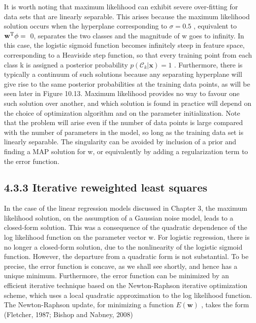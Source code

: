 \documentclass[
  10
]{article}
\begin{document}
It is worth noting that maximum likelihood can exhibit severe
over-fitting for data sets that are linearly separable. This arises
because the maximum likelihood solution occurs when the hyperplane
corresponding to \(\sigma = 0 . 5\) , equivalent to
\({ \bf w } ^ { \mathrm { T } } \phi = { }\) 0, separates the two
classes and the magnitude of w goes to infinity. In this case, the
logistic sigmoid function becomes infinitely steep in feature space,
corresponding to a Heaviside step function, so that every training point
from each class k is assigned a posterior probability
\(p ( \mathcal { C } _ { k } | \mathbf { x } ) = 1\) . Furthermore,
there is typically a continuum of such solutions because any separating
hyperplane will give rise to the same posterior probabilities at the
training data points, as will be seen later in Figure 10.13. Maximum
likelihood provides no way to favour one such solution over another, and
which solution is found in practice will depend on the choice of
optimization algorithm and on the parameter initialization. Note that
the problem will arise even if the number of data points is large
compared with the number of parameters in the model, so long as the
training data set is linearly separable. The singularity can be avoided
by inclusion of a prior and finding a MAP solution for w, or
equivalently by adding a regularization term to the error function.

\subsection{4.3.3 Iterative reweighted least
squares}\label{iterative-reweighted-least-squares}

In the case of the linear regression models discussed in Chapter 3, the
maximum likelihood solution, on the assumption of a Gaussian noise
model, leads to a closed-form solution. This was a consequence of the
quadratic dependence of the log likelihood function on the parameter
vector w. For logistic regression, there is no longer a closed-form
solution, due to the nonlinearity of the logistic sigmoid function.
However, the departure from a quadratic form is not substantial. To be
precise, the error function is concave, as we shall see shortly, and
hence has a unique minimum. Furthermore, the error function can be
minimized by an efficient iterative technique based on the
Newton-Raphson iterative optimization scheme, which uses a local
quadratic approximation to the log likelihood function. The
Newton-Raphson update, for minimizing a function \(E ( \mathbf { w } )\)
, takes the form (Fletcher, 1987; Bishop and Nabney, 2008)
\end{document}
